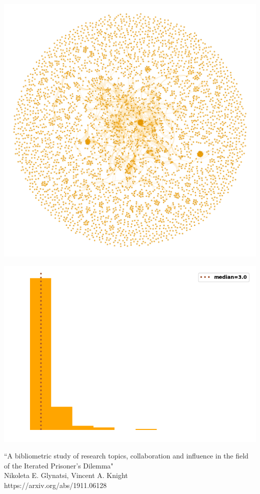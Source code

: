 \documentclass{beamer}
\begin{document}
\begin{frame}
    \begin{center}
    \includegraphics[width=.7\textwidth]{static/pd.png}
    \end{center}
\end{frame}

\begin{frame}
    \begin{center}
    \includegraphics[width=.7\textwidth]{static/degree_dist.png}
    \end{center}
\end{frame}

\begin{frame}
    \begin{center}
        \large{``A bibliometric study of research topics, collaboration and influence in the field of the Iterated Prisoner's Dilemma"} \\ \vspace{.5cm}
        \small{Nikoleta E. Glynatsi, Vincent A. Knight} \\ \vspace{.5cm}
        \small{https://arxiv.org/abs/1911.06128}
    \end{center}
\end{frame}
\end{document}
